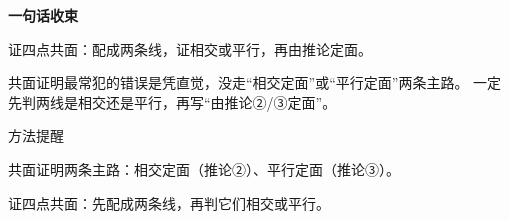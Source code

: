 \documentclass{exam-zh}
\begin{document}
\begin{eduDualExplain}
  \begin{eduExplainLeft}
  \end{eduExplainLeft}

  \begin{eduExplainRight}
      \begin{center}
        \begin{diagramcoltikz}{70mm}{连 $EF\parallel A_1B\parallel D_1C$，由推论③定面。}
        }
        \end{diagramcoltikz}
      \end{center}
    \vspace{1mm}
    {\color{edu-blue}\bfseries\small 一句话收束}\par\vspace{1mm}
    \begin{eduBulletList}
      \item 证四点共面：配成两条线，证相交或平行，再由推论定面。    \end{eduBulletList}
  \end{eduExplainRight}
\end{eduDualExplain}




\begin{eduMistakeBox}
共面证明最常犯的错误是凭直觉，没走“相交定面”或“平行定面”两条主路。
一定先判两线是相交还是平行，再写“由推论②/③定面”。
\end{eduMistakeBox}




\begin{eduSummaryBlock}{\eduIconPin}{方法提醒}
\begin{eduBulletList}
  \item 共面证明两条主路：相交定面（推论②）、平行定面（推论③）。  \item 证四点共面：先配成两条线，再判它们相交或平行。\end{eduBulletList}
\end{eduSummaryBlock}
\end{document}
